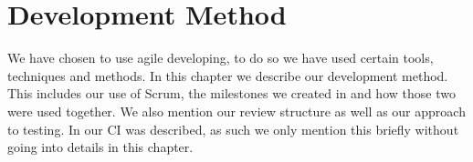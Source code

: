 \chapter{Development Method}\label{cha:development_method}
We have chosen to use agile developing, to do so we have used certain tools, techniques and methods.
In this chapter we describe our development method.
This includes our use of Scrum, the milestones we created in  and how those two were used together.
We also mention our review structure as well as our approach to testing.
In  our \ac{CI} was described, as such we only mention this briefly without going into details in this chapter.

